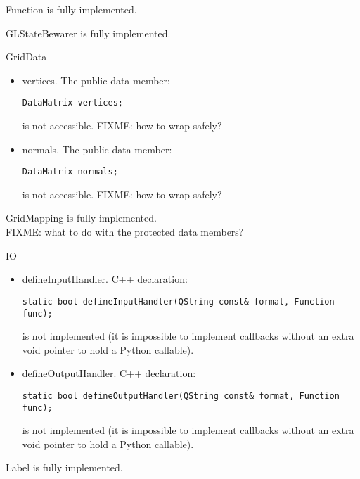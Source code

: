 \documentclass{manual}
\begin{document}
\begin{classdesc*}{Function}
  is fully implemented.
\end{classdesc*}

\begin{classdesc*}{GLStateBewarer}
  is fully implemented.
\end{classdesc*}

\begin{classdesc*}{GridData}
  \begin{itemize}
  \item{vertices}. The public data member:
\begin{verbatim}
DataMatrix vertices;
\end{verbatim}
    is not accessible. FIXME: how to wrap  safely?
  \item{normals}. The public data member:
\begin{verbatim}
DataMatrix normals;
\end{verbatim}
    is not accessible. FIXME: how to wrap  safely?
  \end{itemize}
\end{classdesc*}

\begin{classdesc*}{GridMapping}
  is fully implemented.\\
  FIXME: what to do with the protected data members?
\end{classdesc*}

\begin{classdesc*}{IO}
  \begin{itemize}
  \item{defineInputHandler}. C++ declaration:
\begin{verbatim}
static bool defineInputHandler(QString const& format, Function func);
\end{verbatim}
    is not implemented (it is impossible to implement callbacks without an
    extra void pointer to hold a Python callable).
  \item{defineOutputHandler}. C++ declaration:
\begin{verbatim}
static bool defineOutputHandler(QString const& format, Function func);
\end{verbatim}
    is not implemented (it is impossible to implement callbacks without an
    extra void pointer to hold a Python callable).
  \end{itemize}
\end{classdesc*}

\begin{classdesc*}{Label}
  is fully implemented.
\end{classdesc*}
\end{document}
